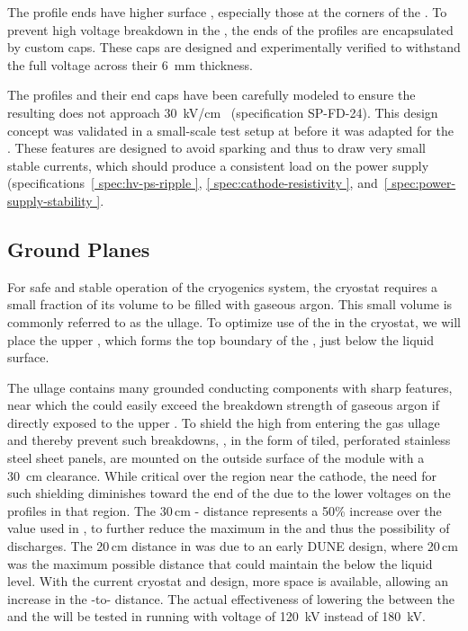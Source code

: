 The profile ends have higher surface \efield{}, especially those at the corners of the . To prevent high voltage breakdown in the , the ends of the profiles are encapsulated by custom  caps.  These caps are designed and experimentally verified to withstand the full voltage across their \SI{6}{\milli\m} thickness. 

The profiles and their end caps have been carefully modeled to ensure the resulting \efield{}
 does not approach \SI{30}{\kV}/{cm}~\cite{Blatter:2014wua} (specification SP-FD-24). This design concept was validated in a small-scale test setup at  before it was adapted for the .  
These features are designed to avoid sparking and thus to draw very small stable currents, 
which should produce a consistent load on the power supply 
(specifications~\ref{ spec:hv-ps-ripple }, \ref{ spec:cathode-resistivity }, 
and~\ref{ spec:power-supply-stability }. %


\subsection{Ground Planes}
\label{sec:fdsp-hv-des-fc-gp}

For safe and stable operation of the  cryogenics system, the cryostat requires a small fraction of its volume to be filled with gaseous argon. This small volume is commonly referred to as the ullage. To optimize use of the  in the cryostat, we will place the upper , which forms the top boundary of the , just below the liquid surface.

The ullage contains many grounded %
conducting components with sharp features, near which the \efield could easily exceed the breakdown strength of gaseous argon if directly exposed to the upper . %
To shield the high \efield from entering the gas ullage and thereby prevent such breakdowns, %
, %
in the form of tiled, perforated stainless steel sheet panels, are mounted on the outside surface of the 
 module with a \SI{30}{cm} clearance. While critical over the region near the cathode, the need for such shielding diminishes toward the  end of the  due to the lower voltages on the  profiles in that region. 
The 30\,cm - distance represents a 50\% increase over the value used in , to further reduce the maximum \efield in the  and thus the possibility of discharges. The 20\,cm distance in  was due to an early DUNE design, where 20\,cm was the maximum possible distance that could maintain the  below the liquid level. With the current cryostat and  design, more space is available, allowing an increase in the -to- distance. The actual effectiveness of lowering the \efield between the  and the  will be tested in  running with  voltage of \SI{120}{\kV} instead of \SI{180}{\kV}.
 
